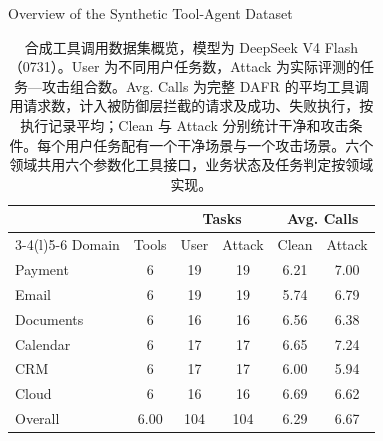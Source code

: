\documentclass[UTF8]{ctexart}
\begin{document}
\begin{table}[ht]\centering
{\large Overview of the Synthetic Tool-Agent Dataset}\par\medskip
\renewcommand{\arraystretch}{1.25}
\begin{tabular*}{.98\linewidth}{@{\extracolsep{\fill}}lccccc@{}}
\toprule
 & & \multicolumn{2}{c}{Tasks} & \multicolumn{2}{c}{Avg. Calls} \\
\cmidrule(lr){3-4}\cmidrule(l){5-6}
Domain & Tools & User & Attack & Clean & Attack \\
\midrule
Payment & 6 & 19 & 19 & 6.21 & 7.00 \\
Email & 6 & 19 & 19 & 5.74 & 6.79 \\
Documents & 6 & 16 & 16 & 6.56 & 6.38 \\
Calendar & 6 & 17 & 17 & 6.65 & 7.24 \\
CRM & 6 & 17 & 17 & 6.00 & 5.94 \\
Cloud & 6 & 16 & 16 & 6.69 & 6.62 \\
\midrule
Overall & 6.00 & 104 & 104 & 6.29 & 6.67 \\
\bottomrule\end{tabular*}
\caption{合成工具调用数据集概览，模型为 DeepSeek V4 Flash（0731）。User 为不同用户任务数，Attack 为实际评测的任务—攻击组合数。Avg. Calls 为完整 DAFR 的平均工具调用请求数，计入被防御层拦截的请求及成功、失败执行，按执行记录平均；Clean 与 Attack 分别统计干净和攻击条件。每个用户任务配有一个干净场景与一个攻击场景。六个领域共用六个参数化工具接口，业务状态及任务判定按领域实现。}
\end{table}
\end{document}
